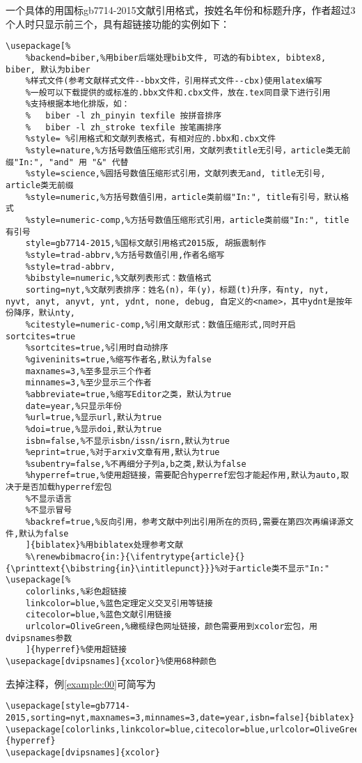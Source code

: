 \documentclass[cn,hazy,blue,14pt,geye,normal,]{elegantnote}
\begin{document}
\begin{example}
	\label{example:00}
一个具体的用国标gb7714-2015文献引用格式，按姓名年份和标题升序，作者超过3个人时只显示前三个，具有超链接功能的实例如下：
\begin{lstlisting}
\usepackage[%
	%backend=biber,%用biber后端处理bib文件, 可选的有bibtex, bibtex8, biber, 默认为biber
	%样式文件(参考文献样式文件--bbx文件，引用样式文件--cbx)使用latex编写
	%一般可以下载提供的或标准的.bbx文件和.cbx文件，放在.tex同目录下进行引用
	%支持根据本地化排版，如：
	%	biber -l zh_pinyin texfile 按拼音排序
	%	biber -l zh_stroke texfile 按笔画排序
	%style= %引用格式和文献列表格式，有相对应的.bbx和.cbx文件
	%style=nature,%方括号数值压缩形式引用，文献列表title无引号，article类无前缀"In:", "and" 用 "&" 代替
	%style=science,%圆括号数值压缩形式引用，文献列表无and, title无引号, article类无前缀
	%style=numeric,%方括号数值引用，article类前缀"In:", title有引号，默认格式
	%style=numeric-comp,%方括号数值压缩形式引用，article类前缀"In:", title有引号
	style=gb7714-2015,%国标文献引用格式2015版, 胡振震制作
	%style=trad-abbrv,%方括号数值引用,作者名缩写
	%style=trad-abbrv,
	%bibstyle=numeric,%文献列表形式：数值格式
	sorting=nyt,%文献列表排序：姓名(n)，年(y)，标题(t)升序，有nty, nyt, nyvt, anyt, anyvt, ynt, ydnt, none, debug, 自定义的<name>，其中ydnt是按年份降序，默认nty,
	%citestyle=numeric-comp,%引用文献形式：数值压缩形式,同时开启sortcites=true
	%sortcites=true,%引用时自动排序
	%giveninits=true,%缩写作者名,默认为false
	maxnames=3,%至多显示三个作者
	minnames=3,%至少显示三个作者
	%abbreviate=true,%缩写Editor之类，默认为true
	date=year,%只显示年份
	%url=true,%显示url,默认为true
	%doi=true,%显示doi,默认为true
	isbn=false,%不显示isbn/issn/isrn,默认为true
	%eprint=true,%对于arxiv文章有用,默认为true
	%subentry=false,%不再细分子列a,b之类,默认为false
	%hyperref=true,%使用超链接，需要配合hyperref宏包才能起作用,默认为auto,取决于是否加载hyperref宏包
	%不显示语言
	%不显示冒号
	%backref=true,%反向引用，参考文献中列出引用所在的页码,需要在第四次再编译源文件,默认为false
	]{biblatex}%用biblatex处理参考文献
	%\renewbibmacro{in:}{\ifentrytype{article}{}{\printtext{\bibstring{in}\intitlepunct}}}%对于article类不显示"In:"
\usepackage[%
	colorlinks,%彩色超链接
	linkcolor=blue,%蓝色定理定义交叉引用等链接
	citecolor=blue,%蓝色文献引用链接
	urlcolor=OliveGreen,%橄榄绿色网址链接，颜色需要用到xcolor宏包，用dvipsnames参数
	]{hyperref}%使用超链接
\usepackage[dvipsnames]{xcolor}%使用68种颜色
\end{lstlisting}\par
\end{example}
\begin{example}
	\label{example:01}
去掉注释，例\ref{example:00}可简写为
\begin{lstlisting}
\usepackage[style=gb7714-2015,sorting=nyt,maxnames=3,minnames=3,date=year,isbn=false]{biblatex}
\usepackage[colorlinks,linkcolor=blue,citecolor=blue,urlcolor=OliveGreen]{hyperref}
\usepackage[dvipsnames]{xcolor}
\end{lstlisting}\par
\end{example}
\end{document}
